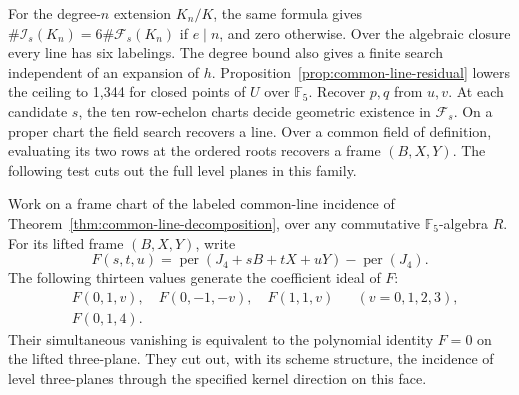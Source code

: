For the degree-\(n\) extension \(K_n/K\), the same formula gives
\(\#\mathcal I_s(K_n)=6\#\mathcal F_s(K_n)\) if \(e\mid n\), and
zero otherwise. Over the algebraic closure every line has six labelings.
The degree bound also gives a finite search independent of an expansion
of \(h\). Proposition~\ref{prop:common-line-residual} lowers the ceiling
to 1,344 for closed points of \(U\) over \(\mathbb F_5\). Recover
\(p,q\) from \(u,v\). At each candidate \(s\), the
ten row-echelon charts decide geometric existence in \(\mathcal F_s\).
On a proper chart the field search recovers a line. Over a common
field of definition, evaluating its two rows at the ordered roots
recovers a frame \((B,X,Y)\). The following test cuts out the full level
planes in this family.

\begin{proposition}
\label{prop:common-line-level-test}
Work on a frame chart of the labeled common-line incidence of
Theorem~\ref{thm:common-line-decomposition}, over any commutative
\(\mathbb F_5\)-algebra \(R\). For its lifted frame \((B,X,Y)\), write
\[
 F(s,t,u)=\operatorname{per}(J_4+sB+tX+uY)-\operatorname{per}(J_4).
\]
The following thirteen values generate the coefficient ideal of \(F\):
\[
\begin{aligned}
 &F(0,1,v),\quad F(0,-1,-v),\quad F(1,1,v)
       &&(v=0,1,2,3),\\
 &F(0,1,4). &&
\end{aligned}
\]
Their simultaneous vanishing is equivalent to the polynomial identity
\(F=0\) on the lifted three-plane. They cut out, with its scheme
structure, the incidence of level three-planes through the specified
kernel direction on this face.
\end{proposition}

